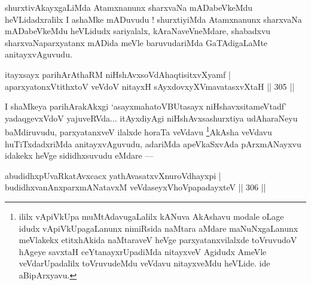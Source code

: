 \begin{artha}
shurxtivAkayxgaLiMda Atamxnanunx sharxvaNa mADabeVkeMdu heVLidadxralilx I ashaMke mADuvudu ! shurxtiyiMda Atamxnanunx sharxvaNa mADabeVkeMdu heVLidudx sariyalalx, kAraNaveVneMdare, shabadxvu sharxvaNaparxyatanx mADida meVle baruvudariMda GaTAdigaLaMte anitayxvAguvudu.
\end{artha}

\begin{shl}
itayxsayx parihArAthaRM niHshAvxsoVdAhaqtisitxvXyamf |
aparxyatonxVtithxtoV veVdoV nitayxH sAyxdovxyXVmavatasxvXtaH \hfill || 305 ||
\end{shl}

\begin{artha}
I shaMkeya parihArakAkxgi `asayxmahatoVBUtasayx niHshavxsitameVtadf' yadaqgevxVdoV yajuveRVda... itAyxdiyAgi niHshAvxsashurxtiya udAharaNeyu baMdiruvudu, parxyatanxveV ilalxde horaTa veVdavu \footnote[2]{ililx vApiVkUpa muMtAdavugaLalilx kANuva AkAshavu modale oLage idudx vApiVkUpagaLanunx nimiRsida naMtara aMdare maNuNxgaLanunx meVlakekx etitxhAkida naMtaraveV heVge parxyatanxvilalxde toVruvudoV hAgeye savxtaH ceYtanayxrUpadiMda nitayxveV Agidudx AmeVle veVdarUpadalilx toVruvudeMdu veVdavu nitayxveMdu heVLide. ide aBipArxyavu.}AkAsha veVdavu huTiTxdadxriMda anitayxvAguvudu, adariMda apeVkaSxvAda pArxmANayxvu idakekx heVge sididhxsuvudu  eMdare  {\rm ---} 
\end{artha}

\begin{shl}
abudidhxpUvaRkatAvxcacx yathAvasatxvXnuroVdhayxpi |
budidhxvanAnxparxmANatavxM veVdaseyxVhoVpapadayxteV \hfill || 306 ||
\end{shl}

